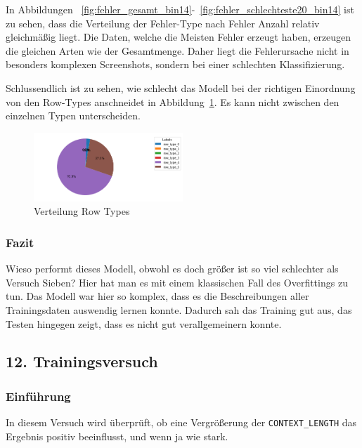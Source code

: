 \documentclass[pdftex,a4paper,halfparskip, article]{scrartcl}
\begin{document}
In Abbildungen ~\ref{fig:fehler_gesamt_bin14}-~\ref{fig:fehler_schlechteste20_bin14} ist zu sehen, dass die Verteilung der Fehler-Type nach Fehler Anzahl relativ gleichmäßig liegt. Die Daten, welche die Meisten Fehler erzeugt haben, erzeugen die gleichen Arten wie der Gesamtmenge. Daher liegt die Fehlerursache nicht in besonders komplexen Screenshots, sondern bei einer schlechten Klassifizierung.

Schlussendlich ist zu sehen, wie schlecht das Modell bei der richtigen Einordnung von den Row-Types anschneidet in Abbildung~\ref{fig:bin14_row_type}. Es kann nicht zwischen den einzelnen Typen unterscheiden.


\begin{figure}[h]
\centering
\includegraphics[width=0.5\textwidth]{predictions_bin14_predicted_row_type_distribution}
\caption{Verteilung Row Types}
\label{fig:bin14_row_type}
\end{figure}


\subsubsection*{Fazit}

Wieso performt dieses Modell, obwohl es doch größer ist so viel schlechter als Versuch Sieben? Hier hat man es mit einem klassischen Fall des Overfittings zu tun. Das Modell war hier so komplex, dass es die Beschreibungen aller Trainingsdaten auswendig lernen konnte. Dadurch sah das Training gut aus, das Testen hingegen zeigt, dass es nicht gut verallgemeinern konnte.


\subsection{12. Trainingsversuch}
\subsubsection*{Einführung}

In diesem Versuch wird überprüft, ob eine Vergrößerung der \texttt{CONTEXT\_LENGTH} das Ergebnis positiv beeinflusst, und wenn ja wie stark. 
\end{document}
